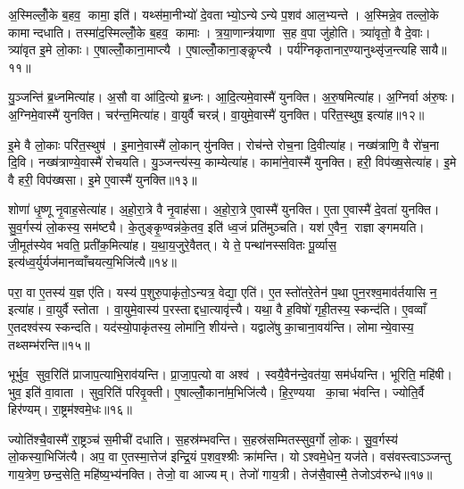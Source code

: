 अ॒स्मिल्लोँ॒के ब॒हव॒ कामा॒ इति॑। यथ्स॑मा॒नीभ्यो॑ दे॒वताभ्यो॒ऽन्येऽन्ये प॒शव॑ आल॒भ्यन्ते। अ॒स्मिन्ने॒व तल्लो॒के कामान्दधाति। तस्मा॑द॒स्मिल्लोँ॒के ब॒हव॒ कामाः। त्र॒या॒णान्त्र॑याणा स॒ह व॒पा जु॑होति। त्र्या॑वृतो॒ वै दे॒वाः। त्र्या॑वृत इ॒मे लो॒काः। ए॒षाल्लोँ॒काना॒माप्त्यै। ए॒षाल्लोँ॒काना॒ङ्कॢप्त्यै। पर्य॑ग्निकृतानार॒ण्यानुथ्सृ॑ज॒न्त्यहिसायै॥११॥\anuvakamend[अव॑रुद्ध्या उ॒भयान्प॒शूनाल॑भते स॒त्यादहिसायै]

यु॒ञ्जन्ति॑ ब्र॒ध्नमित्या॑ह। अ॒सौ वा आ॑दि॒त्यो ब्र॒ध्नः। आ॒दि॒त्यमे॒वास्मै॑ युनक्ति। अ॒रु॒षमित्या॑ह। अ॒ग्निर्वा अ॑रु॒षः। अ॒ग्निमे॒वास्मै॑ युनक्ति। चर॑न्त॒मित्या॑ह। वा॒युर्वै चरन्न्॑। वा॒युमे॒वास्मै॑ युनक्ति। परि॑त॒स्थुष॒ इत्या॑ह॥१२॥

इ॒मे वै लो॒काः परि॑त॒स्थुष॑। इ॒माने॒वास्मै॑ लो॒कान् यु॑नक्ति। रोच॑न्ते रोच॒ना दि॒वीत्या॑ह। नख्ष॑त्राणि॒ वै रो॑च॒ना दि॒वि। नख्ष॑त्राण्ये॒वास्मै॑ रोचयति। यु॒ञ्जन्त्य॑स्य॒ काम्येत्या॑ह। कामा॑ने॒वास्मै॑ युनक्ति। हरी॒ विप॑ख्ष॒सेत्या॑ह। इ॒मे वै हरी॒ विप॑ख्षसा। इ॒मे ए॒वास्मै॑ युनक्ति॥१३॥

शोणा॑ धृ॒ष्णू नृ॒वाह॒सेत्या॑ह। अ॒हो॒रा॒त्रे वै नृ॒वाह॑सा। अ॒हो॒रा॒त्रे ए॒वास्मै॑ युनक्ति। ए॒ता ए॒वास्मै॑ दे॒वता॑ युनक्ति। सु॒व॒र्गस्य॑ लो॒कस्य॒ सम॑ष्ट्यै। के॒तुङ्कृ॒ण्वन्न॑के॒तव॒ इति॑ ध्व॒जं प्रति॑मुञ्चति। यश॑ ए॒वैन॒ राज्ञाङ्गमयति। जी॒मूत॑स्येव भवति॒ प्रती॑क॒मित्या॑ह। य॒था॒य॒जुरे॒वैतत्। ये ते॒ पन्था॑नस्सवितः पू॒र्व्यास॒ इत्य॑ध्व॒र्युर्यज॑मानव्वाँचयत्य॒भिजि॑त्यै॥१४॥

परा॒ वा ए॒तस्य॑ य॒ज्ञ ए॑ति। यस्य॑ प॒शुरु॒पाकृ॑तो॒ऽन्यत्र॒ वेद्या॒ एति॑। ए॒तस्तो॑तरे॒तेन॑ प॒था पुन॒रश्व॒माव॑र्तयासि न॒ इत्या॑ह। वा॒युर्वै स्तोता। वा॒युमे॒वास्य॑ प॒रस्ताद्दधा॒त्यावृ॑त्त्यै। यथा॒ वै ह॒विषो॑ गृही॒तस्य॒ स्कन्द॑ति। ए॒वव्वाँ ए॒तदश्व॑स्य स्कन्दति। यद॑स्यो॒पाकृ॑तस्य॒ लोमा॑नि॒ शीय॑न्ते। यद्वाले॑षु का॒चाना॒वय॑न्ति। लोमान्ये॒वास्य॒ तथ्सम्भ॑रन्ति॥१५॥

भूर्भुव॒ सुव॒रिति॑ प्राजाप॒त्याभि॒राव॑यन्ति। प्रा॒जा॒प॒त्यो वा अश्व॑। स्वयै॒वैन॑न्दे॒वत॑या॒ सम॑र्धयन्ति। भूरिति॒ महि॑षी। भुव॒ इति॑ वा॒वाता। सुव॒रिति॑ परिवृ॒क्ती। ए॒षाल्लोँ॒काना॑म॒भिजि॑त्यै। हि॒र॒ण्यया का॒चा भ॑वन्ति। ज्योति॒र्वै हिर॑ण्यम्। रा॒ष्ट्रम॑श्वमे॒धः॥१६॥

ज्योति॑श्चै॒वास्मै॑ रा॒ष्ट्रञ्च॑ स॒मीची॑ दधाति। स॒हस्र॑म्भवन्ति। स॒हस्र॑सम्मितस्सुव॒र्गो लो॒कः। सु॒व॒र्गस्य॑ लो॒कस्या॒भिजि॑त्यै। अप॒ वा ए॒तस्मा॒त्तेज॑ इन्द्रि॒यं प॒शव॒श्श्रीः क्रा॑मन्ति। योऽश्वमे॒धेन॒ यज॑ते। वस॑वस्त्वाऽञ्जन्तु गाय॒त्रेण॒ छन्द॒सेति॒ महि॑ष्य॒भ्य॑नक्ति। तेजो॒ वा आज्यम्। तेजो॑ गाय॒त्री। तेज॑सै॒वास्मै॒ तेजोऽव॑रुन्धे॥१७॥

